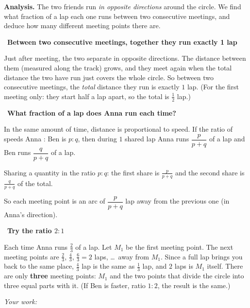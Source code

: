 \documentclass[11pt]{article}
\newif\ifsol \solfalse
\newcommand{\StuProb}[2]{\begin{probboxS}{#1}{#2}\StuProbBody\end{probboxS}}
\newcommand{\probsol}[1]{%
  \begin{lrbox}{\solmeasure}\begin{minipage}{\dimexpr\linewidth-24pt\relax}#1\end{minipage}\end{lrbox}%
  \ifsol
    \begin{solbox}#1\end{solbox}%
  \else
    \setlength{\solht}{\dimexpr\ht\solmeasure+\dp\solmeasure+0.85cm\relax}%
    \ifdim\solht<1.35cm\setlength{\solht}{1.35cm}\fi
    \ifdim\solht>\StudentMaxWork\setlength{\solht}{\StudentMaxWork}\fi
    \par\noindent\begin{minipage}{\linewidth}%
    \expandafter\StuProb\StuProbArgs
    \begin{tcolorbox}[colback=white,colframe=Line,boxrule=0.8pt,arc=5pt,
      left=8pt,right=8pt,top=4pt,bottom=4pt,height=\solht]{\footnotesize\color{Slate}\itshape\WorkWord}\end{tcolorbox}%
    \end{minipage}\par\medskip
  \fi}
\newlength{\StudentMaxWork}\setlength{\StudentMaxWork}{4.5cm}
\newcommand{\step}[2]{\par\smallskip\noindent{\bfseries\color{tmBlue!85!black}\StepWord~#1.}\ {\bfseries #2}\par\nopagebreak}
\def\WorkWord{Your work:}
\def\StepWord{Step}
\begin{document}
\probsol{
\textbf{Analysis.} The two friends run \emph{in opposite directions} around the circle. We find what fraction of a lap each one runs between two consecutive meetings, and deduce how many different meeting points there are.

\step{1}{Between two consecutive meetings, together they run exactly 1 lap}
\begin{proofbox}Just after meeting, the two separate in opposite directions. The distance between them (measured along the track) grows, and they meet again when the total distance the two have run just covers the whole circle. So between two consecutive meetings, the \emph{total} distance they run is exactly $1$ lap. (For the first meeting only: they start half a lap apart, so the total is $\frac12$ lap.)\end{proofbox}

\step{2}{What fraction of a lap does Anna run each time?}
In the same amount of time, distance is proportional to speed. If the ratio of speeds Anna : Ben is $p:q$, then during $1$ shared lap Anna runs $\dfrac{p}{p+q}$ of a lap and Ben runs $\dfrac{q}{p+q}$ of a lap.
\begin{recallbox}Sharing a quantity in the ratio $p:q$: the first share is $\frac{p}{p+q}$ and the second share is $\frac{q}{p+q}$ of the total.\end{recallbox}
So each meeting point is an arc of $\dfrac{p}{p+q}$ lap away from the previous one (in Anna's direction).

\step{3}{Try the ratio $2:1$}
Each time Anna runs $\frac{2}{3}$ of a lap. Let $M_1$ be the first meeting point. The next meeting points are $\frac23$, $\frac43$, $\frac63=2$ laps, \dots\ away from $M_1$. Since a full lap brings you back to the same place, $\frac43$ lap is the same as $\frac13$ lap, and $2$ laps is $M_1$ itself. There are only \textbf{three} meeting points: $M_1$ and the two points that divide the circle into three equal parts with it. (If Ben is faster, ratio $1:2$, the result is the same.)

}
\end{document}
